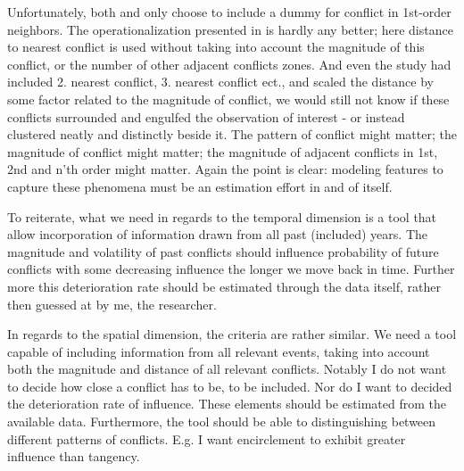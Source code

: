 \documentclass[a4paper]{article}
\begin{document}
Unfortunately, both \cite{ol2010afghanistan} and \cite{weidmann_ward_2010predicting} only choose to include a dummy for conflict in 1st-order neighbors. The operationalization presented in \cite{Maase} is hardly any better; here distance to nearest conflict is used without taking into account the magnitude of this conflict, or the number of other adjacent conflicts zones. And even the study had included 2. nearest conflict, 3. nearest conflict ect., and scaled the distance by some factor related to the magnitude of conflict, we would still not know if these conflicts surrounded and engulfed the observation of interest - or instead clustered neatly and distinctly beside it. The pattern of conflict might matter; the magnitude of conflict might matter; the magnitude of adjacent conflicts in 1st, 2nd and n'th order might matter. Again the point is clear: modeling features to capture these phenomena must be an estimation effort in and of itself.\par




To reiterate, what we need in regards to the temporal dimension is a tool that allow incorporation of information drawn from all past (included) years. The magnitude and volatility of past conflicts should influence probability of future conflicts with some decreasing influence the longer we move back in time. Further more this deterioration rate should be estimated through the data itself, rather then guessed at by me, the researcher.\par

In regards to the spatial dimension, the criteria are rather similar. We need a tool capable of including information from all relevant events, taking into account both the magnitude and distance of all relevant conflicts. Notably I do not want to decide how close a conflict has to be, to be included. Nor do I want to decided the deterioration rate of influence. These elements should be estimated from the available data. Furthermore, the tool should be able to distinguishing between different patterns of conflicts. E.g. I want encirclement to exhibit greater influence than tangency.\par
\end{document}
